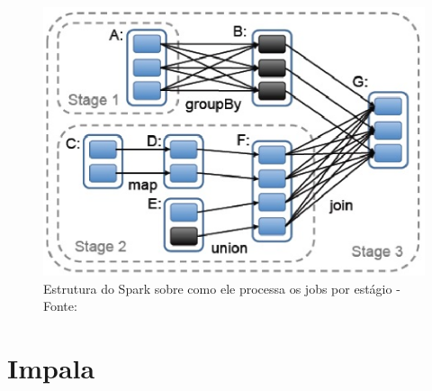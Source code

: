              \begin{figure}[ht!]
                        \centering
                        \includegraphics[keepaspectratio=true,scale=0.7]
                            {figuras/figura16.eps}
                        \caption[Estrutura do Spark sobre como ele processa os jobs por estágio]
                        {Estrutura do Spark sobre como ele processa os jobs por estágio -
                        \protect  Fonte: }
                        \label{figura16}
            \end{figure}

    \section{Impala}




